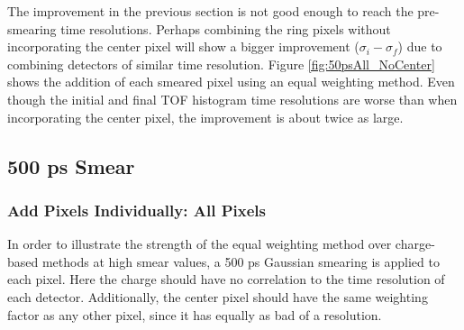\documentclass[twocolumn,aps,prd,reprint,superscriptaddress,floatfix]{revtex4-1}
\begin{document}
The improvement in the previous section is not good enough to reach the pre-smearing time resolutions. 
Perhaps combining the ring pixels without incorporating the center pixel will show a bigger improvement ($\sigma_i-\sigma_f$) due to combining detectors of similar time resolution. 
Figure \ref{fig:50psAll_NoCenter} shows the addition of each smeared pixel using an equal weighting method.
Even though the initial and final TOF histogram time resolutions are worse than when incorporating the center pixel, the improvement is about twice as large.

\subsection{500 ps Smear}
\subsubsection{Add Pixels Individually: All Pixels}
In order to illustrate the strength of the equal weighting method over charge-based methods at high smear values, a 500 ps Gaussian smearing is applied to each pixel.
Here the charge should have no correlation to the time resolution of each detector.
Additionally, the center pixel should have the same weighting factor as any other pixel, since it has equally as bad of a resolution.
\end{document}

